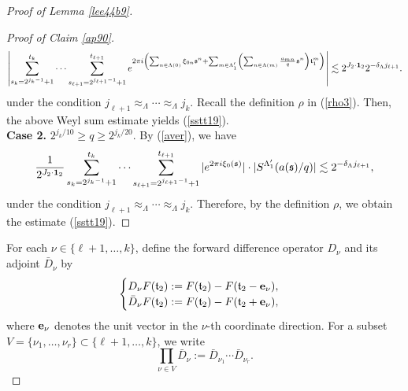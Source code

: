 \documentclass[10pt,a4paper]{amsart}
\numberwithin{equation}{section}
\begin{document}
\begin{proof}[Proof of Lemma \ref{lee44b9}]
\begin{proof}[Proof of Claim \ref{ap90}]
	\begin{align*}
		\left|\sum_{s_k=2^{j_k-1}+1}^{t_k} \cdots \sum_{s_{\ell+1}=2^{j_{\ell+1}-1}+1}^{t_{\ell+1}}  e^{2\pi i\left( \sum_{n\in \Lambda(0)} \xi_{0n}\mathfrak{s}^n+ \sum_{m\in \Lambda_1'}\left(\sum_{n\in \Lambda(m)} \frac{a_{mn}}{q}\mathfrak{s}^n\right)\mathfrak{t}_1^{m}  \right)}\right|
		\lesssim 2^{J_2\cdot {\bf 1}_2}2^{-\delta_{\Lambda} j_{\ell+1}}.
	\end{align*} under the condition $j_{\ell+1}\approx_{\Lambda} \cdots \approx_{\Lambda} j_{k}$.  Recall the definition  $\rho$ in  (\ref{rho3}). Then, the above Weyl sum estimate yields (\ref{sstt19}). 
	\\
	\textbf{Case 2.}  $2^{j_k/10}\ge q\ge 2^{ j_k/20}$. By (\ref{aver}),  we have
	$$\frac{1}{2^{J_2\cdot {\bf 1}_2}}\sum_{s_k=2^{j_k-1}+1}^{t_k} \cdots \sum_{s_{\ell+1}=2^{j_{\ell+1}-1}+1}^{t_{\ell+1}} |e^{2\pi i \xi_0(\mathfrak{s})}|\cdot |S^{\Lambda'_1}(a(\mathfrak{s})/q)|\lesssim 2^{-\delta_{\Lambda}j_{\ell+1}},$$  under the condition $j_{\ell+1}\approx_{\Lambda} \cdots \approx_{\Lambda} j_{k}$. 
	Therefore, by the definition  $\rho$, we  obtain the estimate (\ref{sstt19}).  
\end{proof}


For each $\nu\in \{\ell+1,\dots,k\}$, define the forward difference operator $D_\nu$ and its adjoint $\bar{D}_\nu$ by
\begin{align*}
\begin{cases}
D_\nu F(\mathfrak{t}_2)
:= F(\mathfrak{t}_2)-F(\mathfrak{t}_2-{\bf e}_\nu),\\
\bar{D}_\nu F(\mathfrak{t}_2)
:= F(\mathfrak{t}_2)-F(\mathfrak{t}_2+{\bf e}_\nu),
\end{cases}
\end{align*}
where ${\bf e}_\nu$ denotes the unit vector in the $\nu$-th coordinate direction.  
For a subset $V=\{\nu_1,\dots,\nu_r\}\subset \{\ell+1,\dots,k\}$, we write
\[
\prod_{\nu\in V}\bar{D}_\nu := \bar{D}_{\nu_1}\cdots \bar{D}_{\nu_r}.
\]


\end{proof}
\end{document}
